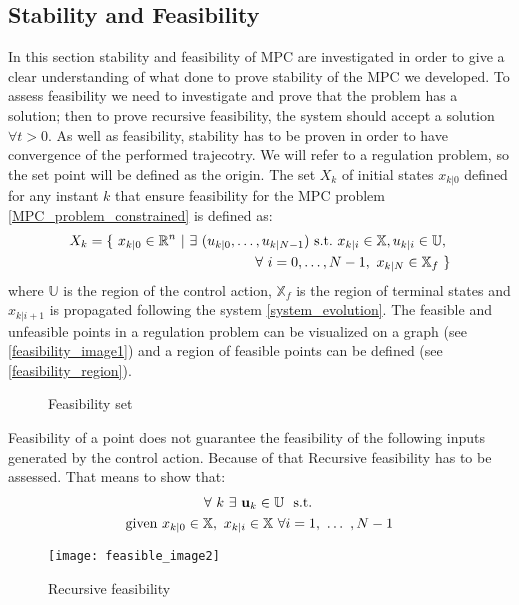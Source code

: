 \subsection{Stability and Feasibility}
In this section stability and feasibility of MPC are investigated in order to give a clear understanding of what done to prove stability of the MPC we developed. To assess feasibility we need to investigate and prove that the problem has a solution; then to prove recursive feasibility, the system should accept a solution $\forall t>0$. As well as feasibility, stability has to be proven in order to have convergence of the performed trajecotry. We will refer to a regulation problem, so the set point will be defined as the origin.
The set $X_{k}$ of initial states $x_{k|0}$ defined for any instant $k$ that ensure feasibility for the MPC problem \ref{MPC_problem_constrained} is defined as:
\begin{equation}
	\begin{split}
		X_{k}=\lbrace\ x_{k|0}\in\mathbb{R}^n\ |\ \exists\  (u_{k|0}, \dots , u_{k|N-1})\ \textnormal{s.t.}\ x_{k|i} \in \mathbb{X}, u_{k|i} \in \mathbb{U},\ &  \\ 
		\forall\  i=0,\dots,N-1,\ x_{k|N} \in \mathbb{X}_f\ \rbrace& \\ 
	\end{split}
	\label{feasibility}
\end{equation}
where $\mathbb{U}$ is the region of the control action, $\mathbb{X}_f$ is the region of terminal states and $x_{k|i+1}$ is propagated following the system \ref{system_evolution}. The feasible and unfeasible points in a regulation problem can be visualized on a graph (see \ref{feasibility_image1}) and a region of feasible points can be defined (see \ref{feasibility_region}).

\begin{figure}%
\centering
{}%
\qquad
{}%
\caption{Feasibility set}
\end{figure}

Feasibility of a point does not guarantee the feasibility of the following inputs generated by the control action. Because of that Recursive feasibility has to be assessed. That means to show that:
\begin{equation}
\begin{split}
&\ \ \ \ \ \ \ \ \ \forall\ k\ \exists\  \textbf{u}_k\in \mathbb{U}\ \  \textnormal{s.t. } \\ 
\textnormal{given } &x_{k|0} \in \mathbb{X}, \  x_{k|i} \in \mathbb{X}\  \forall i = 1,\  \dots\ , N-1   
\end{split}
\end{equation}
\begin{figure}[h!]
	\centering
	\texttt{[image: feasible\_image2]}
	\caption{Recursive feasibility}
	\label{feasible_image2}
\end{figure}

